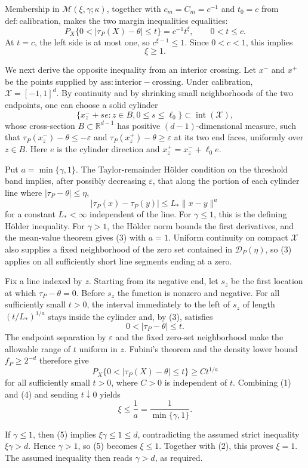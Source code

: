 Membership in \(\mathcal M(\xi,\gamma;\kappa)\), together with \(c_m=C_m=c^{-1}\) and \(t_0=c\) from \(\mathrm{def:calibration}\), makes the two margin inequalities equalities:
\[
P_X\{0<|\tau_P(X)-\theta|\le t\}=c^{-1}t^\xi,
\qquad 0<t\le c.
\tag{1}
\]
At \(t=c\), the left side is at most one, so \(c^{\xi-1}\le1\). Since \(0<c<1\), this implies
\[
\xi\ge1.
\tag{2}
\]

We next derive the opposite inequality from an interior crossing. Let \(x^-\) and \(x^+\) be the points supplied by \(\mathrm{ass:interior-crossing}\). Under calibration, \(\mathcal X=[-1,1]^d\). By continuity and by shrinking small neighborhoods of the two endpoints, one can choose a solid cylinder
\[
\{x^-_z+s e: z\in B, 0\le s\le\ell_0\}\subset\operatorname{int}(\mathcal X),
\]
whose cross-section \(B\subset\mathbb R^{d-1}\) has positive \((d-1)\)-dimensional measure, such that \(\tau_P(x^-_z)-\theta\le-\varepsilon\) and \(\tau_P(x^+_z)-\theta\ge\varepsilon\) at its two end faces, uniformly over \(z\in B\). Here \(e\) is the cylinder direction and \(x^+_z=x^-_z+\ell_0e\).

Put \(a=\min\{\gamma,1\}\). The Taylor-remainder Hölder condition on the threshold band implies, after possibly decreasing \(\varepsilon\), that along the portion of each cylinder line where \(|\tau_P-\theta|\le\eta\),
\[
|\tau_P(x)-\tau_P(y)|\le L_*\|x-y\|^a
\tag{3}
\]
for a constant \(L_*<\infty\) independent of the line. For \(\gamma\le1\), this is the defining Hölder inequality. For \(\gamma>1\), the Hölder norm bounds the first derivatives, and the mean-value theorem gives (3) with \(a=1\). Uniform continuity on compact \(\mathcal X\) also supplies a fixed neighborhood of the zero set contained in \(\mathcal D_P(\eta)\), so (3) applies on all sufficiently short line segments ending at a zero.

Fix a line indexed by \(z\). Starting from its negative end, let \(s_z\) be the first location at which \(\tau_P-\theta=0\). Before \(s_z\) the function is nonzero and negative. For all sufficiently small \(t>0\), the interval immediately to the left of \(s_z\) of length \((t/L_*)^{1/a}\) stays inside the cylinder and, by (3), satisfies
\[
0<|\tau_P-\theta|\le t.
\]
The endpoint separation by \(\varepsilon\) and the fixed zero-set neighborhood make the allowable range of \(t\) uniform in \(z\). Fubini's theorem and the density lower bound \(f_P\ge2^{-d}\) therefore give
\[
P_X\{0<|\tau_P(X)-\theta|\le t\}
\ge C t^{1/a}
\tag{4}
\]
for all sufficiently small \(t>0\), where \(C>0\) is independent of \(t\). Combining (1) and (4) and sending \(t\downarrow0\) yields
\[
\xi\le\frac1a=\frac1{\min\{\gamma,1\}}.
\tag{5}
\]

If \(\gamma\le1\), then (5) implies \(\xi\gamma\le1\le d\), contradicting the assumed strict inequality \(\xi\gamma>d\). Hence \(\gamma>1\), so (5) becomes \(\xi\le1\). Together with (2), this proves \(\xi=1\). The assumed inequality then reads \(\gamma>d\), as required.